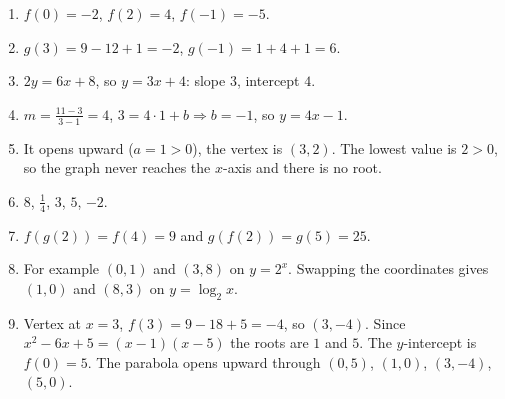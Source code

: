 \begin{enumerate}[label=\textbf{\ansnum.\arabic*}]
  \item $f(0)=-2$, $f(2)=4$, $f(-1)=-5$.
  \item $g(3)=9-12+1=-2$, $g(-1)=1+4+1=6$.
  \item $2y=6x+8$, so $y=3x+4$: slope $3$, intercept $4$.
  \item $m=\frac{11-3}{3-1}=4$, $3=4\cdot1+b\Rightarrow b=-1$, so $y=4x-1$.
  \item It opens upward ($a=1>0$), the vertex is $(3,2)$. The lowest value is $2>0$, so the graph never reaches the $x$-axis and there is no root.
  \item $8$, $\frac14$, $3$, $5$, $-2$.
  \item $f(g(2))=f(4)=9$ and $g(f(2))=g(5)=25$.
  \item For example $(0,1)$ and $(3,8)$ on $y=2^x$. Swapping the coordinates gives $(1,0)$ and $(8,3)$ on $y=\log_2x$.
  \item Vertex at $x=3$, $f(3)=9-18+5=-4$, so $(3,-4)$. Since $x^2-6x+5=(x-1)(x-5)$ the roots are $1$ and $5$. The $y$-intercept is $f(0)=5$. The parabola opens upward through $(0,5)$, $(1,0)$, $(3,-4)$, $(5,0)$.
\end{enumerate}
